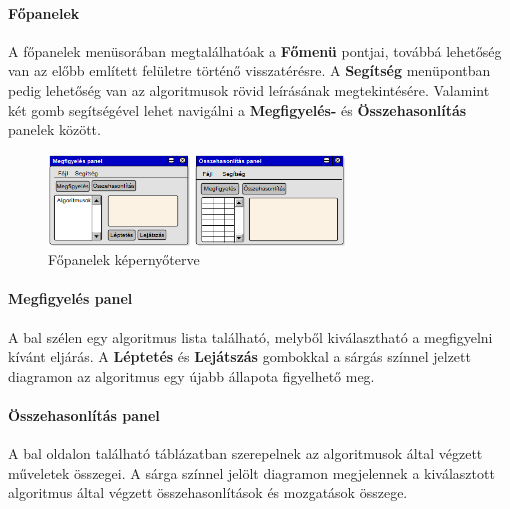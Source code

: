 \documentclass{elteikthesis}
\begin{document}
\paragraph{Főpanelek}
A főpanelek menüsorában megtalálhatóak a \textbf{Főmenü} pontjai, továbbá lehetőség van az előbb említett felületre történő visszatérésre. A \textbf{Segítség} menüpontban pedig lehetőség van az algoritmusok rövid leírásának megtekintésére. Valamint két gomb segítségével lehet navigálni a \textbf{Megfigyelés-} és \textbf{Összehasonlítás} panelek között.
\begin{figure}[H]
	\centering
	\includegraphics[width=0.7\textwidth]{pics/plan_panels.png}
	\caption{Főpanelek képernyőterve}
\end{figure}
\paragraph{Megfigyelés panel}
A bal szélen egy algoritmus lista található, melyből kiválasztható a megfigyelni kívánt eljárás. A \textbf{Léptetés} és \textbf{Lejátszás} gombokkal a sárgás színnel jelzett diagramon az algoritmus egy újabb állapota figyelhető meg.
\paragraph{Összehasonlítás panel}
A bal oldalon található táblázatban szerepelnek az algoritmusok által végzett műveletek összegei. A sárga színnel jelölt diagramon megjelennek a kiválasztott algoritmus által végzett összehasonlítások és mozgatások összege.
\end{document}
